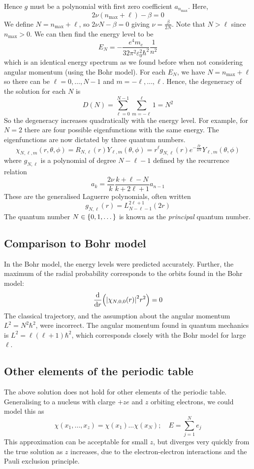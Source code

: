 \documentclass[a4paper]{article}
\begin{document}
Hence \( g \) must be a polynomial with first zero coefficient \( a_{n_{\max}} \).
Here,
\[
	2\nu(n_{\max} + \ell) - \beta = 0
\]
We define \( N = n_{\max} + \ell \), so \( 2 \nu N - \beta = 0 \) giving \( \nu = \frac{\beta}{2N} \).
Note that \( N > \ell \) since \( n_{\max} > 0 \).
We can then find the energy level to be
\[
	E_N = -\frac{e^4 m_e}{32 \pi^2 \varepsilon_0^2 \hbar^2} \frac{1}{n^2}
\]
which is an identical energy spectrum as we found before when not considering angular momentum (using the Bohr model).
For each \( E_N \), we have \( N = n_{\max} + \ell \) so there can be \( \ell = 0, \dots, N-1 \) and \( m = -\ell, \dots, \ell \).
Hence, the degeneracy of the solution for each \( N \) is
\[
	D(N) = \sum_{\ell=0}^{N-1} \sum_{m=-\ell}^\ell 1 = N^2
\]
So the degeneracy increases quadratically with the energy level.
For example, for \( N = 2 \) there are four possible eigenfunctions with the same energy.
The eigenfunctions are now dictated by three quantum numbers.
\[
	\chi_{N,\ell,m}(r,\theta,\phi) = R_{N,\ell}(r)Y_{\ell,m}(\theta,\phi) = r^\ell g_{N,\ell}(r) e^{-\frac{\beta r}{2N}} Y_{\ell,m}(\theta,\phi)
\]
where \( g_{N,\ell} \) is a polynomial of degree \( N - \ell - 1 \) defined by the recurrence relation
\[
	a_k = \frac{2\nu}{k} \frac{k + \ell - N}{k + 2\ell + 1} a_{n-1}
\]
These are the generalised Laguerre polynomials, often written
\[
	g_{N,\ell}(r) = L_{N - \ell - 1}^{2\ell + 1}(2r)
\]
The quantum number \( N \in \qty{0, 1, \dots} \) is known as the \textit{principal} quantum number.

\subsection{Comparison to Bohr model}
In the Bohr model, the energy levels were predicted accurately.
Further, the maximum of the radial probability corresponds to the orbits found in the Bohr model:
\[
	\dv{r} \qty( \abs{\chi_{N,0,0}(r)}^2 r^2) = 0
\]
The classical trajectory, and the assumption about the angular momentum \( L^2 = N^2 \hbar^2 \), were incorrect.
The angular momentum found in quantum mechanics is \( L^2 = \ell(\ell+1) \hbar^2 \), which corresponds closely with the Bohr model for large \( \ell \).

\subsection{Other elements of the periodic table}
The above solution does not hold for other elements of the periodic table.
Generalising to a nucleus with clarge \( +ze \) and \( z \) orbiting electrons, we could model this as
\[
	\chi(x_1, \dots, x_z) = \chi(x_1) \dots \chi(x_N);\quad E = \sum_{j=1}^N e_j
\]
This approximation can be acceptable for small \( z \), but diverges very quickly from the true solution as \( z \) increases, due to the electron-electron interactions and the Pauli exclusion principle.
\end{document}
